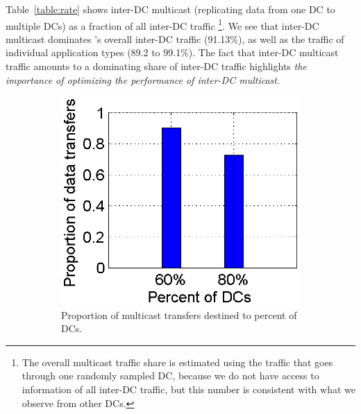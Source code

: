 Table~\ref{table:rate} shows inter-DC multicast (replicating data
from one DC to multiple DCs) as a fraction of all inter-DC traffic \footnote{The overall multicast traffic share is estimated using the traffic that goes through one randomly sampled DC, because we do not have access to information of all inter-DC traffic, but this number is consistent with what we observe from other DCs.}.
We see that inter-DC multicast dominates \company's overall inter-DC
traffic (91.13\%), as well as the traffic of individual application
types (89.2 to 99.1\%). The fact that inter-DC multicast traffic
amounts to a dominating share of inter-DC traffic highlights {\em the
importance of optimizing the performance of inter-DC multicast.}

\begin{figure}[t]
        \centering
        \begin{subfigure}[b]{0.23\textwidth}
                \centering
                \includegraphics[width=\textwidth]{images/destinationDC_v2.eps}%
                \caption{Proportion of multicast transfers destined to percent of DCs.}
                \label{fig:bulk:dest}
        \end{subfigure}
	\hspace{0.1cm}
        \begin{subfigure}[b]{0.23\textwidth}
                \centering

\end{subfigure}
\end{figure}

